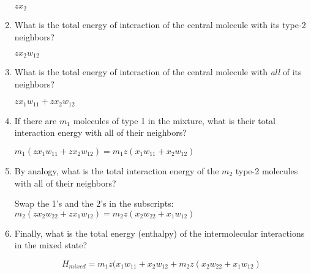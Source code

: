 \begin{activity}
\begin{ctqs}
\begin{enumerate}
					\begin{solution}[0.75in]
						$z x_2$
					\end{solution}
				
				\item What is the total energy of interaction of the central molecule with its type-2 neighbors?
				
					\begin{solution}[0.75in]
						$z x_2 w_{12}$
					\end{solution}
				
				\item What is the total energy of interaction of the central molecule with \emph{all} of its neighbors?
				
					\begin{solution}[0.75in]
						$z x_1 w_{11} + z x_2 w_{12}$
					\end{solution}
				
				\item If there are $m_1$ molecules of type 1 in the mixture, what is their total interaction energy with all of their neighbors?
				
					\begin{solution}[0.75in]
						$m_1(z x_1 w_{11} + z x_2 w_{12}) = m_1 z( x_1 w_{11} + x_2 w_{12})$
					\end{solution}
				
				\item By analogy, what is the total interaction energy of the $m_2$ type-2 molecules with all of their neighbors?
				
					\begin{solution}[0.75in]
					Swap the 1's and the 2's in the subscripts:
						$m_2(z x_2 w_{22} + z x_1 w_{12}) = m_2 z (x_2 w_{22} + x_1 w_{12})$
					\end{solution}
				
				\item Finally, what is the total energy (enthalpy) of the intermolecular interactions in the mixed state?\label{ctq:hmixed}
				
					\begin{solution}[1in]
						\begin{equation*}
							H_{mixed} = m_1 z( x_1 w_{11} + x_2 w_{12} + m_2 z (x_2 w_{22} + x_1 w_{12})
						\end{equation*}
					\end{solution}

			\end{enumerate}
			

\end{ctqs}
\end{activity}
